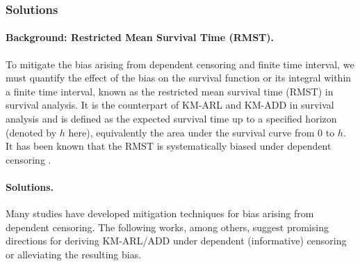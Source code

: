 \documentclass{article}
\theoremstyle{plain}
\theoremstyle{definition}
\theoremstyle{remark}
\begin{document}
\subsubsection{Solutions}
\paragraph{Background: Restricted Mean Survival Time (RMST).}
To mitigate the bias arising from dependent censoring and finite time interval, we must quantify the effect of the bias on the survival function or its integral within a finite time interval, known as the restricted mean survival time (RMST) in survival analysis.
It is the counterpart of KM-ARL and KM-ADD in survival analysis and is defined as the expected survival time up to a specified horizon (denoted by $h$ here), equivalently the area under the survival curve from $0$ to $h$.
It has been known that the RMST is systematically biased under dependent censoring \citep{klein1984asymptotic, rivest2001martingale, ebrahimi2003survival}.

\paragraph{Solutions.}
Many studies have developed mitigation techniques for bias arising from dependent censoring.
The following works, among others, suggest promising directions for deriving KM-ARL/ADD under dependent (informative) censoring or alleviating the resulting bias.
\end{document}

